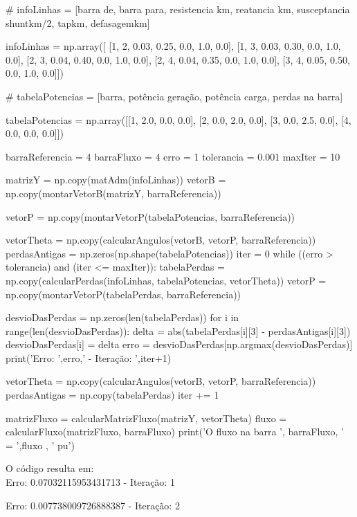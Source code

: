 \begin{python}
# infoLinhas = [barra de, barra para, resistencia km, reatancia km, susceptancia shuntkm/2, tapkm, defasagemkm]

infoLinhas = np.array([ [1, 2, 0.03, 0.25, 0.0, 1.0, 0.0],
                        [1, 3, 0.03, 0.30, 0.0, 1.0, 0.0],
                        [2, 3, 0.04, 0.40, 0.0, 1.0, 0.0],
                        [2, 4, 0.04, 0.35, 0.0, 1.0, 0.0],
                        [3, 4, 0.05, 0.50, 0.0, 1.0, 0.0]])

# tabelaPotencias = [barra, potência geração, potência carga, perdas na barra]

tabelaPotencias = np.array([[1, 2.0, 0.0, 0.0],
                            [2, 0.0, 2.0, 0.0],
                            [3, 0.0, 2.5, 0.0],
                            [4, 0.0, 0.0, 0.0]])

barraReferencia = 4
barraFluxo = 4 
erro = 1
tolerancia = 0.001
maxIter = 10

matrizY = np.copy(matAdm(infoLinhas))
vetorB = np.copy(montarVetorB(matrizY, barraReferencia))

vetorP = np.copy(montarVetorP(tabelaPotencias, barraReferencia))

vetorTheta = np.copy(calcularAngulos(vetorB, vetorP, barraReferencia))
perdasAntigas = np.zeros(np.shape(tabelaPotencias))
iter = 0
while ((erro > tolerancia) and (iter <= maxIter)):
    tabelaPerdas = np.copy(calcularPerdas(infoLinhas, tabelaPotencias, vetorTheta))
    vetorP = np.copy(montarVetorP(tabelaPerdas, barraReferencia))

    desvioDasPerdas = np.zeros(len(tabelaPerdas))
    for i in range(len(desvioDasPerdas)):
        delta = abs(tabelaPerdas[i][3] - perdasAntigas[i][3])
        desvioDasPerdas[i] = delta 
    erro = desvioDasPerdas[np.argmax(desvioDasPerdas)]
    print('Erro: ',erro,' - Iteração: ',iter+1)

    vetorTheta = np.copy(calcularAngulos(vetorB, vetorP, barraReferencia))
    perdasAntigas = np.copy(tabelaPerdas)
    iter += 1

matrizFluxo = calcularMatrizFluxo(matrizY, vetorTheta)
fluxo = calcularFluxo(matrizFluxo, barraFluxo)
print('O fluxo na barra ', barraFluxo, ' = ',fluxo , ' pu')
\end{python}

O código resulta em:\\

Erro:  0.07032115953431713  - Iteração:  1

Erro:  0.007738009726888387  - Iteração:  2

